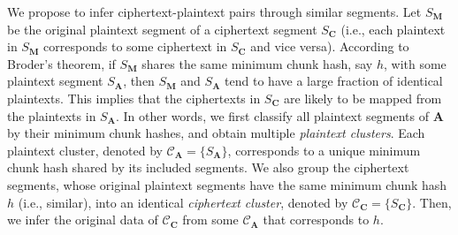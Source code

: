 







 
We propose to infer ciphertext-plaintext pairs through similar segments. Let $S_\mathbf{M}$ be the original plaintext segment of a ciphertext segment $S_\mathbf{C}$ (i.e., each plaintext in $S_\mathbf{M}$ corresponds to some ciphertext in $S_\mathbf{C}$ and vice versa). According to Broder's theorem, if $S_\mathbf{M}$ shares the same minimum chunk hash, say $h$, with some plaintext segment $S_\mathbf{A}$, then $S_\mathbf{M}$  and $S_\mathbf{A}$ tend to have a large fraction of identical plaintexts. This implies that the ciphertexts in $S_\mathbf{C}$ are likely to be mapped from the plaintexts in  $S_\mathbf{A}$. In other words, we first classify all plaintext segments of $\mathbf{A}$ by their minimum chunk hashes, and obtain multiple {\em plaintext clusters}. Each plaintext cluster, denoted by $\mathcal{C}_\mathbf{A} = \{ S_\mathbf{A} \}$, corresponds to a unique minimum chunk hash shared by its included segments. We also 
group the ciphertext segments, whose original plaintext segments have the same minimum chunk hash $h$ (i.e., similar), into an identical {\em ciphertext cluster}, denoted by $\mathcal{C}_\mathbf{C} = \{ S_\mathbf{C} \}$. Then, we infer the original data of $\mathcal{C}_\mathbf{C}$ from some $\mathcal{C}_\mathbf{A}$ that corresponds to  $h$. 

   


